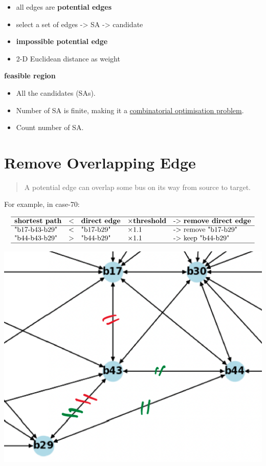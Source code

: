 \documentclass[
]{book}
\providecommand{\tightlist}{%
  \setlength{\itemsep}{0pt}\setlength{\parskip}{0pt}}
\begin{document}
\begin{itemize}
\tightlist
\item
  all edges are \textbf{potential edges}
\item
  select a set of edges -\textgreater{} SA -\textgreater{} candidate
\item
  \textbf{impossible potential edge}
\item
  2-D Euclidean distance as weight
\end{itemize}

\textbf{feasible region}

\begin{itemize}
\tightlist
\item
  All the candidates (SAs).
\item
  Number of SA is finite, making it a \protect\hyperlink{combinatorial}{combinatorial
  optimisation problem}.
\item
  Count number of SA.
\end{itemize}

\hypertarget{overlapping}{%
\section{Remove Overlapping Edge}\label{overlapping}}

\begin{quote}
A potential edge can overlap some bus on its way from source to target.
\end{quote}

For example, in case-70:

\[
\begin{array}{lllll}
  \hline
  \textbf{shortest path} & <
  & \textbf{direct edge} & \times \textbf{threshold}
  & \text{-> } \textbf{remove direct edge} \\
  \hline
  \text{"b17‐b43-b29"} & < & \text{"b17-b29"} & \times 1.1
  & \text{-> remove "b17-b29"} \\
  \text{"b44‐b43-b29"} & > & \text{"b44-b29"} & \times 1.1
  & \text{-> keep "b44-b29"} \\
  \hline
\end{array}
\]

\begin{center}\includegraphics[width=0.6\linewidth]{Pictures/overlapGeth} \end{center}
\end{document}
